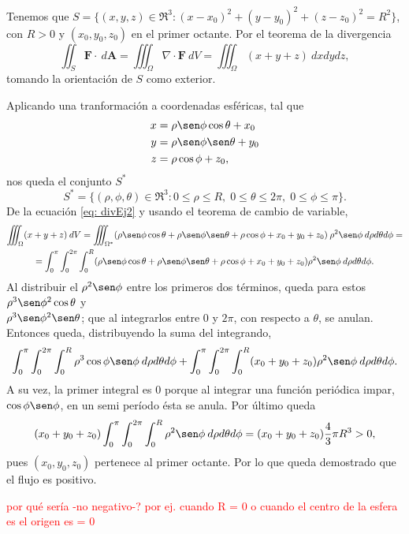 
\begin{solution}
    Tenemos que $S=\{(x,y,z)\in\Re^3:
        (x-x_0)^2+(y-y_0)^2+(z-z_0)^2=R^2\}$, con $R>0$ y
    $(x_0,y_0,z_0)$ en el primer octante.
    Por el teorema de la divergencia
    \begin{equation}
        \iint_S \mathbf{F}\cdot\:d\mathbf{A} = \iiint_\Omega
        \nabla\cdot\mathbf{F}\:dV
        = \iiint_\Omega (x+y+z)\:dxdydz, \label{eq: divEj2}
    \end{equation}
    tomando la orientaci\'on de $S$ como exterior.

    Aplicando una tranformaci\'on a coordenadas esf\'ericas, tal que
    \begin{align*}
        x & =\rho\sen\phi\cos\theta+x_0 \\
        y & =\rho\sen\phi\sen\theta+y_0 \\
        z & =\rho\cos\phi+z_0,
    \end{align*}
    nos queda el conjunto $S^*$
    \[
        S^*=\{(\rho,\phi,\theta)\in\Re^3:0\leq\rho\leq R,\;
        0\leq\theta\leq2\pi,\;0\leq\phi\leq\pi\}.
    \]
    De la ecuaci\'on \eqref{eq: divEj2} y usando el teorema
    de cambio de variable,
    \begin{gather*}
        \iiint_\Omega (x+y+z) \:dV = \iiint_{\Omega^*}
        (\rho\sen\phi\cos\theta + \rho\sen\phi\sen\theta
        + \rho\cos\phi + x_0 + y_0 + z_0)
        \:\rho^2\sen\phi\:d\rho d\theta d\phi=\\
        = \int_0^\pi\int_0^{2\pi}\int_0^R (\rho\sen\phi\cos\theta
        + \rho\sen\phi\sen\theta + \rho\cos\phi
        + x_0 + y_0 + z_0)\rho^2\sen\phi\:d\rho d\theta d\phi.
    \end{gather*}
    Al distribuir el $\rho^2\sen\phi$ entre los primeros dos
    t\'erminos, queda para estos \(\rho^3\sen\phi^2\cos\theta\) y \\
    \(\rho^3\sen\phi^2\sen\theta\); que al integrarlos entre 0
    y $2\pi$, con respecto a $\theta$, se anulan. Entonces queda,
    distribuyendo la suma del integrando,
    \[
        \int_0^\pi\int_0^{2\pi}\int_0^R \rho^3\cos\phi\sen\phi\:
        d\rho d\theta d\phi + \int_0^\pi\int_0^{2\pi}\int_0^R
        (x_0 + y_0 + z_0)\rho^2\sen\phi\:d\rho d\theta d\phi.
    \]
    A su vez, la primer integral es 0 porque al integrar una
    funci\'on peri\'odica impar, $\cos\phi\sen\phi$, en un
    semi per\'iodo \'esta se anula. Por \'ultimo queda
    \[
        (x_0 + y_0 + z_0)\int_0^\pi\int_0^{2\pi}\int_0^R
        \rho^2\sen\phi\:d\rho d\theta d\phi = (x_0 + y_0 + z_0)
        \frac{4}{3}\pi R^3 > 0,
    \]
    pues $(x_0, y_0, z_0)$ pertenece al primer octante.
    Por lo que queda demostrado que el flujo es positivo.

    \textcolor{red}{por qu\'e ser\'ia -no negativo-? por ej. 
    cuando R = 0 o cuando el centro de la esfera es el origen es = 0}
\end{solution}

